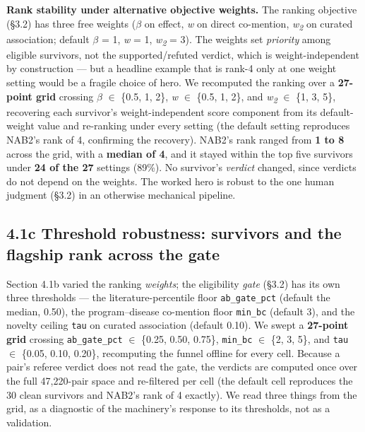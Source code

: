 \noindent \textbf{Rank stability under alternative objective weights.} The ranking objective (\S{}3.2) has three free weights
($\beta$ on effect, \emph{w} on direct co-mention, \emph{w\textsubscript{2}} on curated association; default $\beta$ = 1, \emph{w} = 1, \emph{w\textsubscript{2}} = 3). The
weights set \emph{priority} among eligible survivors, not the supported/refuted verdict, which is
weight-independent by construction --- but a headline example that is rank-4 only at one weight setting would
be a fragile choice of hero. We recomputed the ranking over a \textbf{27-point grid} crossing $\beta$ $\in$ \{0.5, 1, 2\},
\emph{w} $\in$ \{0.5, 1, 2\}, and \emph{w\textsubscript{2}} $\in$ \{1, 3, 5\}, recovering each survivor's weight-independent score component from
its default-weight value and re-ranking under every setting (the default setting reproduces NAB2's rank of
4, confirming the recovery). NAB2's rank ranged from \textbf{1 to 8} across the grid, with a \textbf{median of 4}, and
it stayed within the top five survivors under \textbf{24 of the 27} settings (89\%). No survivor's \emph{verdict}
changed, since verdicts do not depend on the weights. The worked hero is robust to the one human judgment
(\S{}3.2) in an otherwise mechanical pipeline.

\subsection*{4.1c Threshold robustness: survivors and the flagship rank across the gate}\label{threshold-robustness-survivors-and-the-flagship-rank-across-the-gate}

Section 4.1b varied the ranking \emph{weights}; the eligibility \emph{gate} (\S{}3.2) has its own three
thresholds --- the literature-percentile floor \texttt{ab\_gate\_pct} (default the median, 0.50), the
program--disease co-mention floor \texttt{min\_bc} (default 3), and the novelty ceiling \texttt{tau} on
curated association (default 0.10). We swept a \textbf{27-point grid} crossing \texttt{ab\_gate\_pct} $\in$
\{0.25, 0.50, 0.75\}, \texttt{min\_bc} $\in$ \{2, 3, 5\}, and \texttt{tau} $\in$ \{0.05, 0.10, 0.20\},
recomputing the funnel offline for every cell. Because a pair's referee verdict does not read the gate, the
verdicts are computed once over the full 47,220-pair space and re-filtered per cell (the default cell
reproduces the 30 clean survivors and NAB2's rank of 4 exactly). We read three things from the grid, as a
diagnostic of the machinery's response to its thresholds, not as a validation.

